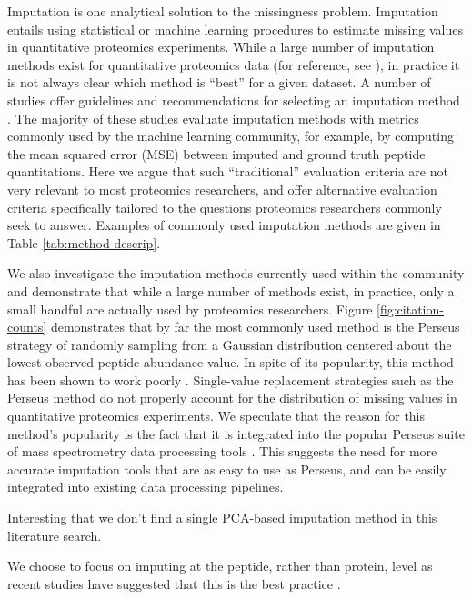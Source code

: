 \documentclass{article}
\begin{document}
Imputation is one analytical solution to the missingness problem. Imputation entails using statistical or machine learning procedures to estimate missing values in quantitative proteomics experiments. While a large number of imputation methods exist for quantitative proteomics data (for reference, see \cite{Bramer:review, Webb-Robertson:review}), in practice it is not always clear which method is ``best'' for a given dataset. A number of studies offer guidelines and recommendations for selecting an imputation method \cite{Jin, DIMA, lazar, valikangas, dabke}. The majority of these studies evaluate imputation methods with metrics commonly used by the machine learning community, for example, by computing the mean squared error (MSE) between imputed and ground truth peptide quantitations. Here we argue that such “traditional” evaluation criteria are not very relevant to most proteomics researchers, and offer alternative evaluation criteria specifically tailored to the questions proteomics researchers commonly seek to answer. Examples of commonly used imputation methods are given in Table \ref{tab:method-descrip}. 

We also investigate the imputation methods currently used within the community and demonstrate that while a large number of methods exist, in practice, only a small handful are actually used by proteomics researchers. Figure \ref{fig:citation-counts} demonstrates that by far the most commonly used method is the Perseus \cite{Perseus} strategy of randomly sampling from a Gaussian distribution centered about the lowest observed peptide abundance value. In spite of its popularity, this method has been shown to work poorly \cite{Bramer:review, Webb-Robertson:review}. Single-value replacement strategies such as the Perseus method do not properly account for the distribution of missing values in quantitative proteomics experiments. We speculate that the reason for this method's popularity is the fact that it is integrated into the popular Perseus suite of mass spectrometry data processing tools \cite{Perseus}. This suggests the need for more accurate imputation tools that are as easy to use as Perseus, and can be easily integrated into existing data processing pipelines. 

Interesting that we don't find a single PCA-based imputation method in this literature search. 

We choose to focus on imputing at the peptide, rather than protein, level as recent studies have suggested that this is the best practice \cite{humpty-dumpty}.
\end{document}
